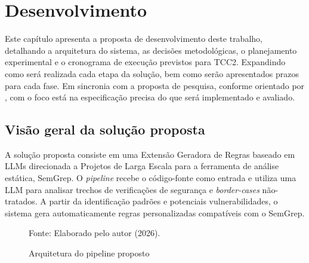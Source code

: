 \documentclass[
    12pt,                %
    openright,           %
    oneside,             %
    a4paper,             %
    english,             %
    brazil               %
]{abntex2}
\begin{document}
\chapter{Desenvolvimento}
\label{cap:desenvolvimento}
\par
Este capítulo apresenta a proposta de desenvolvimento deste trabalho, detalhando a arquitetura do sistema, as decisões metodológicas, o planejamento experimental e o cronograma de execução previstos para TCC2. 
Expandindo como será realizada cada etapa da solução, bem como serão apresentados prazos para cada fase.
Em sincronia com a proposta de pesquisa, conforme orientado por , com o foco está na especificação precisa do que será implementado e avaliado.

\section{Visão geral da solução proposta}
\label{sec:solucao}
\par
A solução proposta consiste em uma Extensão Geradora de Regras baseado em LLMs direcionada a Projetos de Larga Escala para a ferramenta de análise estática, SemGrep.
O \textit{pipeline} recebe o código-fonte como entrada e utiliza uma LLM para analisar trechos de verificações de segurança e \textit{border-cases} não-tratados. A partir da identificação padrões e potenciais vulnerabilidades, o sistema gera automaticamente regras personalizadas compatíveis com o SemGrep.

\begin{figure}[htbp]
    \centering
    \caption{Arquitetura do pipeline proposto}
    \label{fig:pipetable}
    \vspace{0.5em}
    \footnotesize Fonte: Elaborado pelo autor (2026).
\end{figure}
\end{document}
